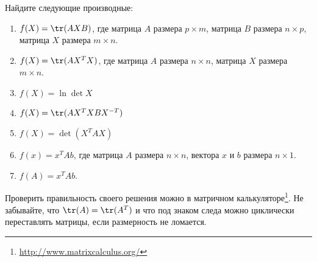 

\begin{problem}{}
	Найдите следующие производные:
	\begin{enumerate}
		\item $f(X) = \tr(AXB)$, где матрица $A$ размера $p \times m$, матрица $B$ размера $n \times p$, матрица $X$ размера $m \times n$.  %
		
		\item $f(X) = \tr(AX^TX)$, где матрица $A$ размера $n \times n$, матрица $X$ размера $m \times n$.  %
		
		\item $f(X) = \ln \det X$ %
		
		\item $f(X) = \tr(AX^TXBX^{-T})$
		
		\item $f(X) = \det(X^TAX)$
		
		\item $f(x) = x^TAb$, где матрица $A$ размера $n \times n$, вектора $x$ и $b$ размера $n \times 1$. 
		
		\item $f(A) = x^TAb$. 
	\end{enumerate}
\end{problem}
\begin{sol} 
Проверить правильность своего решения можно в матричном калькуляторе\footnote{ \url{http://www.matrixcalculus.org/}}. Не забывайте, что $\tr(A) = \tr(A^T)$ и что под знаком следа можно циклически переставлять матрицы, если размерность не ломается. 
\end{sol} 


